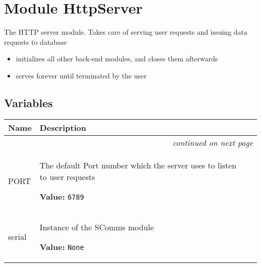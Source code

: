 %
%
%


\section{Module HttpServer}

    \label{HttpServer}
The HTTP server module. Takes care of serving user requests and issuing 
data requests to database

\begin{itemize}
\setlength{\parskip}{0.6ex}
  \item initializes all other back-end modules, and closes them afterwards

  \item serves forever until terminated by the user

\end{itemize}



  \subsection{Variables}

    \vspace{-1cm}
\hspace{\varindent}\begin{longtable}{|p{\varnamewidth}|p{\vardescrwidth}|l}
\cline{1-2}
\cline{1-2} \centering \textbf{Name} & \centering \textbf{Description}& \\
\cline{1-2}
\endhead\cline{1-2}\multicolumn{3}{r}{\small\textit{continued on next page}}\\\endfoot\cline{1-2}
\endlastfoot\raggedright P\-O\-R\-T\- & \raggedright The default Port number which the server uses to listen to user 
          requests

\textbf{Value:} 
{\tt 6789}&\\
\cline{1-2}
\raggedright s\-e\-r\-i\-a\-l\- & \raggedright Instance of the SComms module

\textbf{Value:} 
{\tt None}&\\
\cline{1-2}
\end{longtable}


